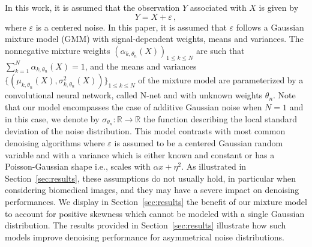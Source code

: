 \documentclass{article}
\begin{document}
In this work, it is assumed that the observation $Y$ associated with $X$  is given by
\begin{equation}
\label{eq:def:Y}
Y = X + \varepsilon\,,
\end{equation}
where $\varepsilon$ is a centered noise. In this paper, it is assumed that $\varepsilon$ follows a Gaussian mixture model (GMM) with signal-dependent weights, means and variances.
The nonnegative mixture weights $(\alpha_{k,\theta_n}(X))_{1\leqslant k\leqslant N}$ are such that $\sum_{k=1}^N\alpha_{k,\theta_n}(X) = 1$, and the means and variances $\{(\mu_{k,\theta_n}(X),\sigma_{k,\theta_n}^2(X))\}_{1\leqslant k\leqslant N}$ of the mixture model are  parameterized by a convolutional neural network, called N-net and with unknown weights $\theta_n$.
Note that our model encompasses the case of additive Gaussian noise when $N=1$ and in this case, we denote by $\sigma_{\theta_n}: \mathbb{R} \to \mathbb{R}$ the function describing the local standard deviation of the noise distribution.
This model contrasts with most common denoising algorithms where $\varepsilon$ is assumed to be a centered Gaussian random variable and with a variance which is either known and constant or has a Poisson-Gaussian shape i.e., scales with $\alpha x + \eta^2$.
As illustrated in Section~\ref{sec:results}, these assumptions do not usually hold, in particular when considering biomedical images, and they may have a severe impact on denoising performances.
We display in Section~\ref{sec:results} the benefit of our mixture model  to account for positive skewness which cannot be modeled with a single Gaussian distribution.
The results provided in Section~\ref{sec:results} illustrate how such models improve denoising performance for asymmetrical noise distributions.
\end{document}
